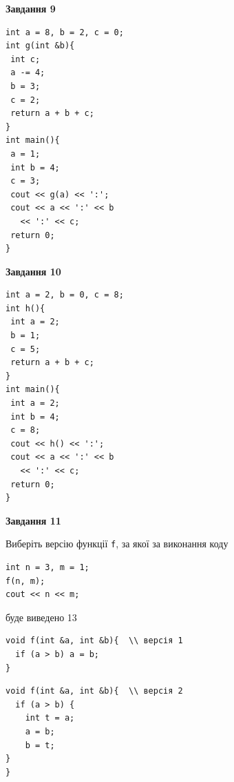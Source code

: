 \documentclass[12pt, ukrainian]{article}
\def\code#1{\Verb!#1!}
\begin{document}
{\begin {large}
\begin{minipage}[t]{11.0cm}
\end{minipage}


\begin{minipage}[t]{7.0cm}

\begin{center}
\textbf{Завдання 9}
\end{center}
\vspace{-8mm}

\begin{verbatim}
int a = 8, b = 2, c = 0;
int g(int &b){
 int c;
 a -= 4;
 b = 3;
 c = 2;
 return a + b + c;
}
int main(){
 a = 1;
 int b = 4;
 c = 3;
 cout << g(a) << ':';
 cout << a << ':' << b 
   << ':' << c;
 return 0;
}
\end{verbatim}



\begin{center}
\textbf{Завдання 10}
\end{center}
\vspace{-8mm}

\begin{verbatim}
int a = 2, b = 0, c = 8;
int h(){
 int a = 2;
 b = 1;
 c = 5;
 return a + b + c;
}
int main(){
 int a = 2;
 int b = 4;
 c = 8;
 cout << h() << ':';
 cout << a << ':' << b 
   << ':' << c;
 return 0;
}
\end{verbatim}

\end{minipage}
\vline \hspace{1mm}
\begin{minipage}[t]{11.0cm}

\begin{center}
\textbf{Завдання 11}
\end{center}
Виберіть версію функції \code{f}, за якої за виконання коду
\begin{verbatim}
int n = 3, m = 1;
f(n, m);
cout << n << m;
\end{verbatim}

буде виведено 13

\begin{verbatim}
void f(int &a, int &b){  \\ версія 1
  if (a > b) a = b;
}
\end{verbatim}

\vspace{-8mm}\begin{verbatim}
void f(int &a, int &b){  \\ версія 2
  if (a > b) {
    int t = a;
    a = b;
    b = t;
}  
}
\end{verbatim}


\end{minipage}
\end{large}}
\end{document}
